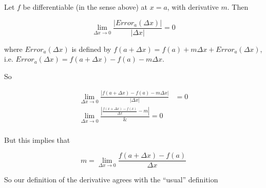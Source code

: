 \documentclass{ximera}
\begin{document}
	\begin{free-response}
		Let $f$ be differentiable (in the sense above) at $x=a$, with derivative $m$.  Then 
		
		\[ \lim_{\Delta x \to 0} \frac{\left|Error_a(\Delta x)|}{\left|\Delta x\right|} = 0 \]
		
		where $Error_a(\Delta x)$ is defined by $f(a+\Delta x) = f(a) + m\Delta x + Error_a(\Delta x)$, i.e. $Error_a(\Delta x) = f(a+\Delta x) - f(a) -m\Delta x$.
		
		So 
		
		\begin{align*}
			\lim_{\Delta x \to 0} \frac{\left|f(a+\Delta x) - f(a) -m\Delta x|}{\left|\Delta x\right|} &= 0\\
			\lim_{\Delta x \to 0} \frac{\left| \frac{f(x+\Delta x) -f(x)}{\Delta x} - m\right|} &= 0\\
		\end{align*}
		
		But this implies that
		
		\[m = \lim_{\Delta x \to 0}\frac{f(a+\Delta x)-f(a)}{\Delta x}\]
		
		So our definition of the derivative agrees with the  ``usual'' definition

		\end{free-response}
	
	
\end{document}
